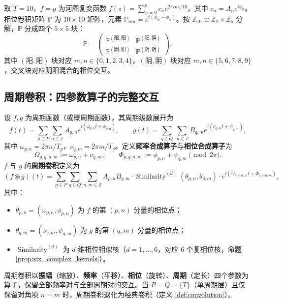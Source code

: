 \begin{example}[河图相位卷积的具体矩阵]\label{ex:hetu_phase_convolution}
取 $T = 10$，$f = g$ 为河图复变函数 $f(z) = \sum_{n=0}^{9} c_n e^{2\pi i n z/10}$，其中 $c_n = A_n e^{i\phi_n}$。相位卷积矩阵 $\mathbb{P}$ 为 $10 \times 10$ 矩阵，元素 $\mathbb{P}_{mn} = e^{i(\phi_m - \phi_n)}$。按 $\mathbb{Z}_{10} \cong \mathbb{Z}_2 \times \mathbb{Z}_5$ 分解，$\mathbb{P}$ 分成四个 $5 \times 5$ 块：
\[
\mathbb{P} = \begin{pmatrix} \mathbb{P}^{(\text{阳},\text{阳})} & \mathbb{P}^{(\text{阳},\text{阴})} \\ \mathbb{P}^{(\text{阴},\text{阳})} & \mathbb{P}^{(\text{阴},\text{阴})} \end{pmatrix},
\]
其中 $(\text{阳},\text{阳})$ 块对应 $m, n \in \{0,1,2,3,4\}$，$(\text{阴},\text{阴})$ 块对应 $m, n \in \{5,6,7,8,9\}$，交叉块对应阴阳混合的相位交互。
\end{example}

\subsection{\texorpdfstring{周期卷积：四参数算子的完整交互}{周期卷积}}
\label{subsec:periodic_convolution_series}

\begin{definition}[周期卷积]\label{def:periodic_convolution}
设 $f, g$ 为周期函数（或概周期函数），其周期级数展开为
\[
f(t) = \sum_{p \in P} \sum_{n \in \mathbb{Z}} A_{p,n} e^{i(\omega_{p,n} t + \phi_{p,n})}, \qquad
g(t) = \sum_{q \in Q} \sum_{m \in \mathbb{Z}} B_{q,m} e^{i(\nu_{q,m} t + \psi_{q,m})},
\]
其中 $\omega_{p,n} = 2\pi n / T_p$，$\nu_{q,m} = 2\pi m / T_q$。定义\textbf{频率合成算子}与\textbf{相位合成算子}为
\[
\Omega_{p,q,n,m} := \omega_{p,n} + \nu_{q,m}, \qquad
\Phi_{p,q,n,m} := \phi_{p,n} + \psi_{q,m} \pmod{2\pi}.
\]
$f$ 与 $g$ 的\textbf{周期卷积}定义为
\[
(f \circledast g)(t) = \sum_{p \in P} \sum_{q \in Q} \sum_{n, m \in \mathbb{Z}} A_{p,n} B_{q,m} \cdot \operatorname{Similarity}^{(d)}(\theta_{p,n}, \theta_{q,m}) \cdot e^{i(\Omega_{p,q,n,m} t + \Phi_{p,q,n,m})},
\]
其中：
\begin{itemize}
    \item $\theta_{p,n} = (\omega_{p,n}, \phi_{p,n})$ 为 $f$ 的第 $(p,n)$ 分量的相位点；
    \item $\theta_{q,m} = (\nu_{q,m}, \psi_{q,m})$ 为 $g$ 的第 $(q,m)$ 分量的相位点；
    \item $\operatorname{Similarity}^{(d)}$ 为 $d$ 维相位相似核（$d = 1, \dots, 6$，对应 6 个复相位核，命题 \ref{prop:six_complex_kernels}）。
\end{itemize}
周期卷积以\textbf{振幅}（缩放）、\textbf{频率}（平移）、\textbf{相位}（旋转）、\textbf{周期}（定长）四个参数为算子，保留全部频率对与全部周期对的交互。当 $P = Q = \{T\}$（单周期层）且仅保留对角项 $n = m$ 时，周期卷积退化为经典卷积（定义 \ref{def:convolution}）。
\end{definition}

